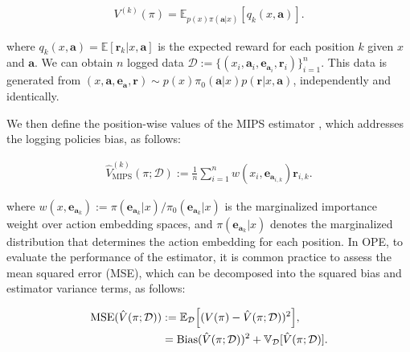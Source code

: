 \documentclass[a4paper,10pt]{article} %
\begin{document}
\begin{multicols}{2}
\vspace{-5mm}
\begin{align}
    V^{(k)}(\pi) = \mathbb{E}_{p(x)\pi(\boldsymbol{a}|x)}[q_{k}(x, \boldsymbol{a})].
\end{align}
\vspace{-5mm}

where \( q_{k}(x, \boldsymbol{a}) = \mathbb{E}[\boldsymbol{r}_k|x,\boldsymbol{a}] \) is the expected reward for each position \( k \) given \( x \) and \( \boldsymbol{a} \). We can obtain \( n \) logged data \( \mathcal{D} := \{ (x_i, \boldsymbol{a}_i, \boldsymbol{e}_{\boldsymbol{a}_i}, \boldsymbol{r}_i) \}_{i=1}^{n} \). This data is generated from \( (x,\boldsymbol{a}, \boldsymbol{e}_{\boldsymbol{a}}, \boldsymbol{r}) \sim p(x)\pi_{0}(\boldsymbol{a}|x)p(\boldsymbol{r}|x,\boldsymbol{a}) \), independently and identically.

We then define the position-wise values of the MIPS estimator \cite{saito2022off}, which addresses the logging policies bias, as follows:

\vspace{-6mm}
\begin{align}
    \hat{V}^{(k)}_{\text{MIPS}}(\pi;\mathcal{D}) := \frac{1}{n}\sum_{i=1}^{n} w(x_i, \boldsymbol{e}_{\boldsymbol{a}_{i,k}}) \boldsymbol{r}_{i,k}.
\end{align}
\vspace{-4mm}

where \( w(x, \boldsymbol{e}_{\boldsymbol{a}_k}) := \pi(\boldsymbol{e}_{\boldsymbol{a}_k}|x) / \pi_{0}(\boldsymbol{e}_{\boldsymbol{a}_k}|x) \) is the marginalized importance weight over action embedding spaces, and \( \pi(\boldsymbol{e}_{\boldsymbol{a}_k}|x) \) denotes the marginalized distribution that determines the action embedding for each position. In OPE, to evaluate the performance of the estimator, it is common practice to assess the mean squared error (MSE), which can be decomposed into the squared bias and estimator variance terms, as follows:

\vspace{-5mm}
\begin{align}
    \text{MSE}(\hat{V}(\pi;\mathcal{D})) &:= \mathbb{E}_{\mathcal{D}} \Big[(V(\pi) - \hat{V}(\pi;\mathcal{D}))^2 \Big], \\
    &= \text{Bias}(\hat{V}(\pi;\mathcal{D}))^2 + \mathbb{V}_{\mathcal{D}}[\hat{V}(\pi;\mathcal{D})]. \notag
\end{align}
\vspace{-5mm}


\end{multicols}
\end{document}
